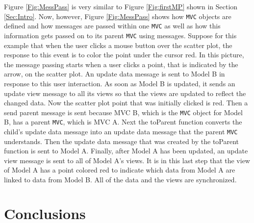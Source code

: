 \documentclass{article}[11pt]
\newcommand{\Rfunction}[1]{{\textsf{#1}}}
\newcommand{\Robject}[1]{{\texttt{#1}}}
\begin{document}
Figure \ref{Fig:MessPass} is very similar to Figure \ref{Fig:firstMP} shown in
Section \ref{Sec:Intro}.  Now, however, Figure \ref{Fig:MessPass} shows how
\Robject{MVC} objects are defined and how messages are passed within one
\Robject{MVC} as well as how this information gets passed on to its parent
\Robject{MVC} using messages.  Suppose for this example that when the user
clicks a mouse button over the scatter plot, the response to this event is to
color the point under the cursor 
red.  In this picture, the message passing starts when a user clicks a point,
that is indicated by the arrow, on the scatter plot.  An update data message is
sent to Model B in response to this user interaction.  As soon as Model B is
updated, it sends an update view message to all its views so that the views
are updated to reflect the changed data.  Now the scatter plot point that was
initially clicked is red.  Then a send parent message is sent because MVC
B, which is the \Robject{MVC} object for Model B, has a parent \Robject{MVC},
which is MVC A.  Next the \Rfunction{toParent} function converts the child's
update data message into an update data message that the parent \Robject{MVC}
understands.  Then the update data message that was created by the
\Rfunction{toParent} function is sent to Model A.  Finally, after Model A has
been updated, an update view message is sent to all of Model A's views.  It is
in this last step that the view of Model A has a point colored red to indicate
which data from Model A are linked to data from Model B.  All of the data and
the views are synchronized. 

\section{Conclusions}\label{Sec:Conc}


\end{document}
